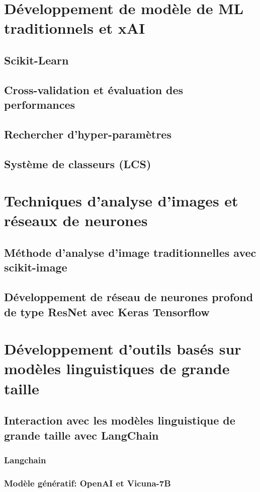 \section{Développement de modèle de ML traditionnels et xAI}
\subsection{Scikit-Learn}
\subsection{Cross-validation et évaluation des performances}
\subsection{Rechercher d'hyper-paramètres}
\subsection{Système de classeurs (LCS)}
\section{Techniques d'analyse d'images et réseaux de neurones}
\subsection{Méthode d'analyse d'image traditionnelles avec scikit-image}
\subsection{Développement de réseau de neurones profond de type ResNet avec Keras Tensorflow}
\section{Développement d'outils basés sur modèles linguistiques de grande taille}
\subsection{Interaction avec les modèles linguistique de grande taille avec LangChain}
\subsubsection{Langchain}
\subsubsection{Modèle génératif: OpenAI et Vicuna-7B}
